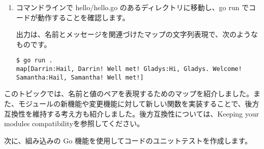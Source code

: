 \begin{enumerate}
\item コマンドラインで hello/hello.go のあるディレクトリに移動し、go run でコードが動作することを確認します。

出力は、名前とメッセージを関連づけたマップの文字列表現で、次のようなものです。

\begin{lstlisting}[numbers=none]
$ go run .
map[Darrin:Hail, Darrin! Well met! Gladys:Hi, Gladys. Welcome! Samantha:Hail, Samantha! Well met!]
\end{lstlisting}

\end{enumerate}



このトピックでは、名前と値のペアを表現するためのマップを紹介しました。また、モジュールの新機能や変更機能に対して新しい関数を実装することで、後方互換性を維持する考え方も紹介しました。後方互換性については、Keeping your modules compatibilityを参照してください。

次に、組み込みの Go 機能を使用してコードのユニットテストを作成します。
